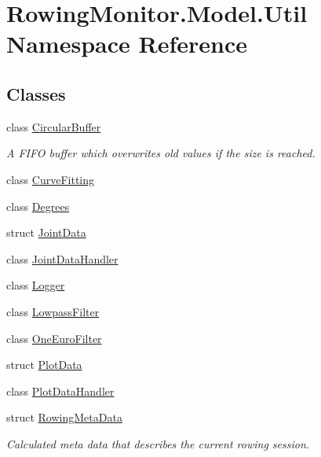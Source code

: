 \hypertarget{namespace_rowing_monitor_1_1_model_1_1_util}{}\section{Rowing\+Monitor.\+Model.\+Util Namespace Reference}
\label{namespace_rowing_monitor_1_1_model_1_1_util}
\subsection*{Classes}
\begin{DoxyCompactItemize}
\item 
class \hyperlink{class_rowing_monitor_1_1_model_1_1_util_1_1_circular_buffer}{Circular\+Buffer}
\begin{DoxyCompactList}\small\item\em A F\+I\+FO buffer which overwrites old values if the size is reached. \end{DoxyCompactList}\item 
class \hyperlink{class_rowing_monitor_1_1_model_1_1_util_1_1_curve_fitting}{Curve\+Fitting}
\item 
class \hyperlink{class_rowing_monitor_1_1_model_1_1_util_1_1_degrees}{Degrees}
\item 
struct \hyperlink{struct_rowing_monitor_1_1_model_1_1_util_1_1_joint_data}{Joint\+Data}
\item 
class \hyperlink{class_rowing_monitor_1_1_model_1_1_util_1_1_joint_data_handler}{Joint\+Data\+Handler}
\item 
class \hyperlink{class_rowing_monitor_1_1_model_1_1_util_1_1_logger}{Logger}
\item 
class \hyperlink{class_rowing_monitor_1_1_model_1_1_util_1_1_lowpass_filter}{Lowpass\+Filter}
\item 
class \hyperlink{class_rowing_monitor_1_1_model_1_1_util_1_1_one_euro_filter}{One\+Euro\+Filter}
\item 
struct \hyperlink{struct_rowing_monitor_1_1_model_1_1_util_1_1_plot_data}{Plot\+Data}
\item 
class \hyperlink{class_rowing_monitor_1_1_model_1_1_util_1_1_plot_data_handler}{Plot\+Data\+Handler}
\item 
struct \hyperlink{struct_rowing_monitor_1_1_model_1_1_util_1_1_rowing_meta_data}{Rowing\+Meta\+Data}
\begin{DoxyCompactList}\small\item\em Calculated meta data that describes the current rowing session. \end{DoxyCompactList}\item 

\end{DoxyCompactItemize}
